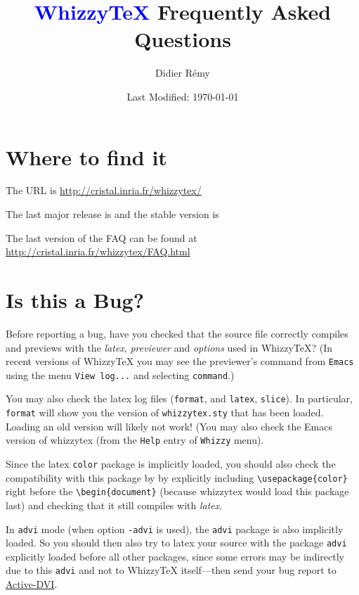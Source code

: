 \documentclass{article}
\title {\textcolor{blue}{WhizzyTeX}  Frequently Asked Questions}
\author {Didier R{\'{e}}my}
\date {Last Modified: \today}
\def \WhizzyTeX{Whizzy\TeX}
\begin{document}
\maketitle

\tableofcontents

\section {Where to find it}

The URL is \url{http://cristal.inria.fr/whizzytex/}

The last major release is {\release}
and the stable version is {\version}

The last version of the FAQ can be found at 
\url{http://cristal.inria.fr/whizzytex/FAQ.html}

\hypertarget{isitabug}{}
\section {Is this a Bug?}

Before reporting a bug, have you checked that the source file correctly
compiles and previews with the \emph{latex}, \emph{previewer}
and \emph{options} used in {\WhizzyTeX}?
(In recent versions of {\WhizzyTeX} you may see the previewer's command from 
\texttt{Emacs} using the menu \texttt{View log...} and selecting
\texttt{command}.) 

You may also check the latex log files (\texttt{format}, and
\texttt{latex}, \texttt{slice}). In particular, \texttt{format} will show
you the version of \texttt{whizzytex.sty} that has been loaded. Loading an
old version will likely not work! (You may also check the Emacs version of
whizzytex (from the \texttt{Help} entry of \texttt{Whizzy} menu). 

Since the latex \texttt{color} package is implicitly loaded, you 
should also check the compatibility with this package by 
by explicitly including \verb"\usepackage{color}" right before the
\verb"\begin{document}" (because whizzytex would load this package last) 
and checking that it still compiles with \emph{latex}.

In \texttt{advi} mode (when option \texttt{-advi} is used), the
\texttt{advi} package is also implicitly loaded. So you should then also try
to latex your source with the package \texttt{advi} explicitly loaded before
all other packages, since some errors may be indirectly due to this
\texttt{advi} and not to {\WhizzyTeX} itself---then send your bug report
to \href{http://cristal.inria.fr/advi/}{Active-DVI}.
\end{document}
